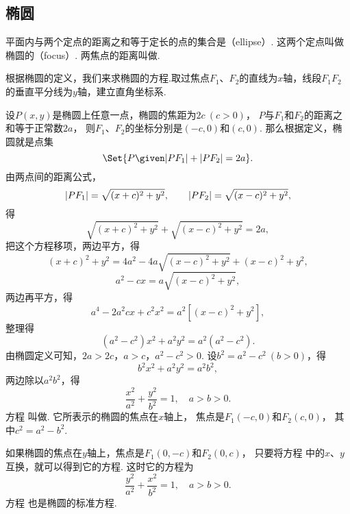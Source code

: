 \subsection{椭圆}
\begin{definition}
平面内与两个定点的距离之和等于定长的点的集合是（ellipse）.
这两个定点叫做椭圆的（focus）.
两焦点的距离叫做.
\end{definition}

根据椭圆的定义，我们来求椭圆的方程.取过焦点\(F_1\)、\(F_2\)的直线为\(x\)轴，线段\(F_1 F_2\)的垂直平分线为\(y\)轴，建立直角坐标系.

设\(P(x,y)\)是椭圆上任意一点，椭圆的焦距为\(2c\ (c > 0)\)，
\(P\)与\(F_1\)和\(F_2\)的距离之和等于正常数\(2a\)，
则\(F_1\)、\(F_2\)的坐标分别是\((-c,0)\)和\((c,0)\).
那么根据定义，椭圆就是点集\[
	\Set{ P \given \abs{P F_1} + \abs{P F_2} = 2a }.
\]
由两点间的距离公式，\[
	\abs{P F_1} = \sqrt{(x+c)^2+y^2}, \qquad
	\abs{P F_2} = \sqrt{(x-c)^2+y^2},
\]得\[
	\sqrt{(x+c)^2+y^2} + \sqrt{(x-c)^2+y^2} = 2a,
\]
把这个方程移项，两边平方，得\[
	(x+c)^2+y^2 = 4a^2 - 4a\sqrt{(x-c)^2+y^2} + (x-c)^2+y^2,
\]\[
	a^2 - cx = a\sqrt{(x-c)^2+y^2},
\]两边再平方，得\[
	a^4 - 2 a^2 cx + c^2 x^2 = a^2 [(x-c)^2+y^2],
\]整理得\[
	(a^2 - c^2) x^2 + a^2 y^2 = a^2 (a^2 - c^2).
\]由椭圆定义可知，\(2a > 2c\)，\(a > c\)，\(a^2 - c^2 > 0\).
设\(b^2 = a^2 - c^2\ (b > 0)\)，得\[
	b^2 x^2 + a^2 y^2 = a^2 b^2,
\]
两边除以\(a^2 b^2\)，得\begin{equation}\label{equation:解析几何.椭圆的标准方程1}
	\frac{x^2}{a^2} + \frac{y^2}{b^2} = 1,
	\quad a > b > 0.
\end{equation}
方程  叫做.
它所表示的椭圆的焦点在\(x\)轴上，
焦点是\(F_1(-c,0)\)和\(F_2(c,0)\)，
其中\(c^2 = a^2 - b^2\).

如果椭圆的焦点在\(y\)轴上，焦点是\(F_1(0,-c)\)和\(F_2(0,c)\)，
只要将方程  中的\(x\)、\(y\)互换，就可以得到它的方程.
这时它的方程为\begin{equation}\label{equation:解析几何.椭圆的标准方程2}
	\frac{y^2}{a^2} + \frac{x^2}{b^2} = 1,
	\quad a > b > 0.
\end{equation}
方程  也是椭圆的标准方程.

